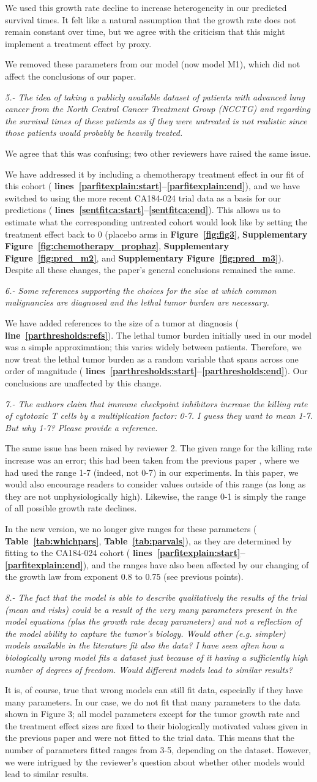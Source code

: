 \documentclass{article}
\newcommand{\revr}[1]{{\color{gray} \itshape #1}}
\newcommand{\auth}[1]{{#1}}
\newcommand{\chng}[1]{{\color{blue!70!black} #1}}
\newcommand{\myref}[2]{{\bfseries\color{red!70!black} Figure~\ref{#1}#2}}
\newcommand{\mytref}[1]{{\bfseries\color{red!70!black} Table~\ref{#1}}}
\newcommand{\mysupp}[2]{{\bfseries\color{red!70!black} Supplementary Figure~\ref{#1}#2}}
\newcommand{\lr}[1]{{\bfseries\color{red!70!black} lines~\ref{#1:start}--\ref{#1:end}}}
\newcommand{\lro}[1]{{\bfseries\color{red!70!black} line~\ref{#1}}}
\newcommand{\untreated}{\auth{We agree that this was confusing; two other reviewers have raised the same issue.}

\chng{We have addressed it by including a chemotherapy treatment effect in our fit of this cohort (\lr{parfitexplain}), and we have switched to using the more recent CA184-024 trial data as a basis for our predictions (\lr{sentfitca}). This allows us to estimate what the corresponding untreated cohort would look like by setting the treatment effect back to 0 (placebo arms in \myref{fig:fig3}{}, \mysupp{fig:chemotherapy_prophaz}{}, \mysupp{fig:pred_m2}{}, and \mysupp{fig:pred_m3}{}). Despite all these changes, the paper's general conclusions remained the same.}}
\newcommand{\killingranges}[1]{
\auth{The same issue has been raised by reviewer #1. The given range for the killing rate increase was an error; this had been taken from the previous paper \cite{Creemers2021}, where we had used the range 1-7 (indeed, not 0-7) in our experiments. In this paper, we would also encourage readers to consider values outside of this range (as long as they are not unphysiologically high). Likewise, the range 0-1 is simply the range of all possible growth rate declines.}

\chng{
In the new version, we no longer give ranges for these parameters (\mytref{tab:whichpars}, \mytref{tab:parvals}), as they are determined by fitting to the CA184-024 cohort (\lr{parfitexplain}), and the ranges have also been affected by our changing of the growth law from exponent 0.8 to 0.75 (see previous points).
}
}
\begin{document}
\auth{We used this growth rate decline to increase heterogeneity in our predicted survival times. It felt like a natural assumption that the growth rate does not remain constant over time, but we agree with the criticism that this might implement a treatment effect by proxy.}

\chng{We removed these parameters from our model (now model M1), which did not affect the conclusions of our paper.} 

\revr{5.- The idea of taking a publicly available dataset of patients with advanced lung cancer from the North
Central Cancer Treatment Group (NCCTG) and regarding the survival times of these patients as if they
were untreated is not realistic since those patients would probably be heavily treated.}

\untreated{}

\revr{6.- Some references supporting the choices for the size at which common malignancies are diagnosed and the lethal tumor burden are necessary.}

\chng{We have added references to the size of a tumor at diagnosis (\lro{parthresholds:refs}). The lethal tumor burden initially used in our model was a simple approximation; this varies widely between patients. Therefore, we now treat the lethal tumor burden as a random variable that spans across one order of magnitude (\lr{parthresholds}). Our conclusions are unaffected by this change.}

\revr{7.- The authors claim that immune checkpoint inhibitors increase the killing rate of cytotoxic T cells by a multiplication factor: 0-7. I guess they want to mean 1-7. But why 1-7? Please provide a reference.}

\killingranges{2}

\revr{8.- The fact that the model is able to describe qualitatively the results of the trial (mean and risks) could be a result of the very many parameters present in the model equations (plus the growth rate decay parameters) and not a reflection of the model ability to capture the tumor's biology. Would other (e.g. simpler) models available in the literature fit also the data? I have seen often how a biologically wrong model fits a dataset just because of it having a sufficiently high number of degrees of freedom. Would different models lead to similar results?}

\auth{
It is, of course, true that wrong models can still fit data, especially if they have many parameters. In our case, we do not fit that many parameters to the data shown in Figure 3; all model parameters except for the tumor growth rate and the treatment effect sizes are fixed to their biologically motivated values given in the previous paper and were not fitted to the trial data. This means that the number of parameters fitted ranges from 3-5, depending on the dataset. However, we were intrigued by the reviewer's question about whether other models would lead to similar results.
}
\end{document}
